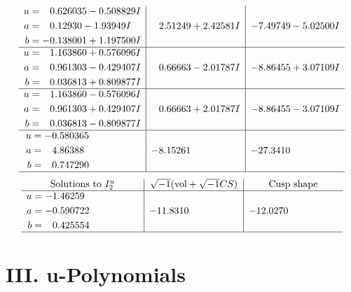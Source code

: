 \documentclass[1p]{elsarticle_modified}
\theoremstyle{definition}
\newcommand{\I}{\sqrt{-1}}
\begin{document}
$$\begin{array}{c|c|c}
\begin{aligned}
u &= \phantom{-}0.626035 - 0.508829 I \\
a &= \phantom{-}0.12930 - 1.93949 I \\
b &= -0.138001 + 1.197500 I\end{aligned}
 & \phantom{-}2.51249 + 2.42581 I & -7.49749 - 5.02500 I \\ \hline\begin{aligned}
u &= \phantom{-}1.163860 + 0.576096 I \\
a &= \phantom{-}0.961303 - 0.429407 I \\
b &= \phantom{-}0.036813 + 0.809877 I\end{aligned}
 & \phantom{-}0.66663 - 2.01787 I & -8.86455 + 3.07109 I \\ \hline\begin{aligned}
u &= \phantom{-}1.163860 - 0.576096 I \\
a &= \phantom{-}0.961303 + 0.429407 I \\
b &= \phantom{-}0.036813 - 0.809877 I\end{aligned}
 & \phantom{-}0.66663 + 2.01787 I & -8.86455 - 3.07109 I \\ \hline\begin{aligned}
u &= -0.580365\phantom{ +0.000000I} \\
a &= \phantom{-}4.86388\phantom{ +0.000000I} \\
b &= \phantom{-}0.747290\phantom{ +0.000000I}\end{aligned}
 & -8.15261\phantom{ +0.000000I} & -27.3410\phantom{ +0.000000I}\\
 \hline 
 \end{array}$$\newpage$$\begin{array}{c|c|c}  
\text{Solutions to }I^u_{2}& \I (\text{vol} + \sqrt{-1}CS) & \text{Cusp shape}\\
 \hline 
\begin{aligned}
u &= -1.46259\phantom{ +0.000000I} \\
a &= -0.590722\phantom{ +0.000000I} \\
b &= \phantom{-}0.425554\phantom{ +0.000000I}\end{aligned}
 & -11.8310\phantom{ +0.000000I} & -12.0270\phantom{ +0.000000I}\\
 \hline 
 \end{array}$$\newpage
\newpage\renewcommand{\arraystretch}{1}
\centering \section*{ III. u-Polynomials}
\end{document}
